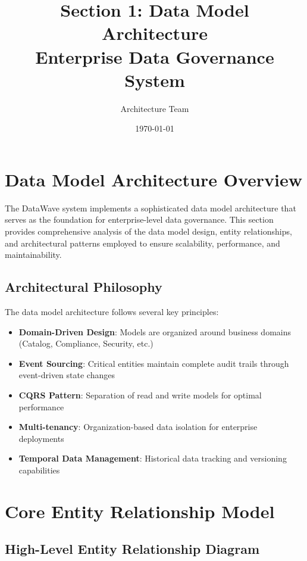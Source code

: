 \documentclass[12pt,a4paper]{article}
\title{\textbf{Section 1: Data Model Architecture\\
Enterprise Data Governance System}}
\author{Architecture Team}
\date{\today}
\begin{document}
\maketitle

\section{Data Model Architecture Overview}

The DataWave system implements a sophisticated data model architecture that serves as the foundation for enterprise-level data governance. This section provides comprehensive analysis of the data model design, entity relationships, and architectural patterns employed to ensure scalability, performance, and maintainability.

\subsection{Architectural Philosophy}

The data model architecture follows several key principles:

\begin{itemize}
    \item \textbf{Domain-Driven Design}: Models are organized around business domains (Catalog, Compliance, Security, etc.)
    \item \textbf{Event Sourcing}: Critical entities maintain complete audit trails through event-driven state changes
    \item \textbf{CQRS Pattern}: Separation of read and write models for optimal performance
    \item \textbf{Multi-tenancy}: Organization-based data isolation for enterprise deployments
    \item \textbf{Temporal Data Management}: Historical data tracking and versioning capabilities
\end{itemize}

\section{Core Entity Relationship Model}

\subsection{High-Level Entity Relationship Diagram}
\end{document}
